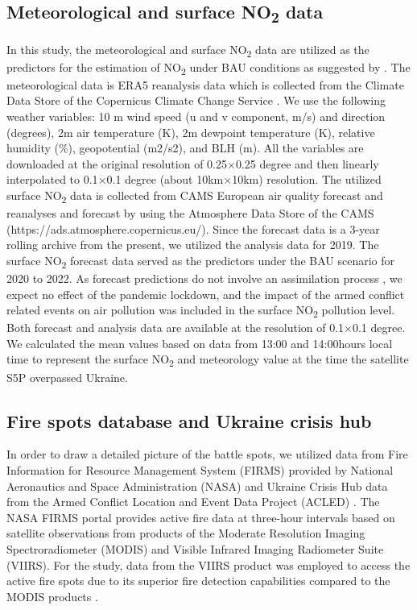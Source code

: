 \subsection{Meteorological and surface NO\textsubscript{2} data}
In this study, the meteorological and surface NO\textsubscript{2} data are utilized as the predictors for the estimation of NO\textsubscript{2} under BAU conditions as suggested by \citep{barre2021estimating}. The meteorological data is ERA5 reanalysis data which is collected from the Climate Data Store of the Copernicus Climate Change Service \citep{hersbach2018era5}. We use the following weather variables: 10 m wind speed  (u and v component, m/s) and direction (degrees), 2m air temperature (K), 2m dewpoint temperature (K), relative humidity (\%), geopotential (m2/s2), and BLH (m). All the variables are downloaded at the original resolution of 0.25$\times$0.25 degree and then linearly interpolated to 0.1$\times$0.1 degree (about 10km$\times$10km) resolution. The utilized surface NO\textsubscript{2} data is collected from CAMS European air quality forecast and reanalyses and forecast \citep{marecal2015regional} by using the Atmosphere Data Store of the CAMS (https://ads.atmosphere.copernicus.eu/). Since the forecast data is a 3-year rolling archive from the present, we utilized the analysis data for 2019. The surface NO\textsubscript{2} forecast data served as the predictors under the BAU scenario for 2020 to 2022. As forecast predictions do not involve an assimilation process \citep{barre2021estimating}, we expect no effect of the pandemic lockdown, and the impact of the armed conflict related events on air pollution was included in the surface NO\textsubscript{2} pollution level. Both forecast and analysis data are available at the resolution of 0.1$\times$0.1 degree. We calculated the mean values based on data from 13:00 and 14:00hours local time to represent the surface NO\textsubscript{2} and meteorology value at the time the satellite S5P overpassed Ukraine. \par
\subsection{Fire spots database and Ukraine crisis hub}
In order to draw a detailed picture of the battle spots, we utilized data from Fire Information for Resource Management System (FIRMS) provided by National Aeronautics and Space Administration (NASA) and Ukraine Crisis Hub data from the Armed Conflict Location and Event Data Project (ACLED) \citep{raleigh2010introducing}. The NASA FIRMS portal provides active fire data at three-hour intervals based on satellite observations from products of the Moderate Resolution Imaging Spectroradiometer (MODIS) and Visible Infrared Imaging Radiometer Suite (VIIRS). For the study, data from the VIIRS product was employed to access the active fire spots due to its superior fire detection capabilities compared to the MODIS products \citep{csiszar2014active,schroeder2014new}. \par

